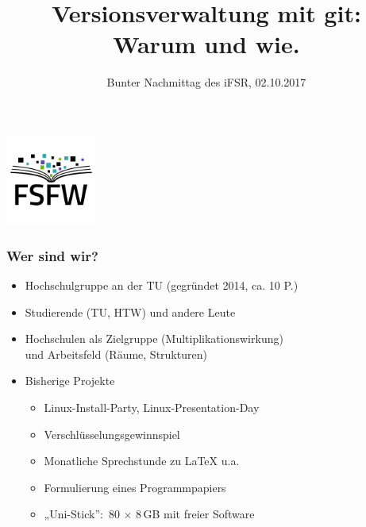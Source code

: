 \documentclass{beamer}
\title{Versionsverwaltung mit git: Warum und wie.}
\subtitle{Bunter Nachmittag des iFSR, 02.10.2017}
\begin{document}
\begin{frame}
  \begin{center}%
    \includegraphics[width=3cm]{img-src/fsfw-logo-with-text.pdf}\\

    \vspace*{-0.5\baselineskip}

    \parbox{.95\columnwidth}{\centering\Large\inserttitle}

    \vspace*{\baselineskip}

    \structure{\large \insertsubtitle}
  \end{center}
\end{frame}

\begin{frame}[label=wb]

\begin{center}
 \vspace{10mm}
\end{center}

\end{frame}



\begin{frame}[label=ct1]
  \frametitle{Wer sind wir?}

  \onslide<+->

  \begin{itemize}
  \item Hochschulgruppe an der TU (gegründet 2014, ca. 10 P.)
  \item Studierende (TU, HTW) und andere Leute
  \item Hochschulen als Zielgruppe (Multiplikationswirkung)\\
    und Arbeitsfeld (Räume, Strukturen)

    \bigskip\onslide<+->

  \item Bisherige Projekte
    \begin{itemize}
    \item Linux-Install-Party, Linux-Presentation-Day
    \item Verschlüsselungsgewinnspiel
    \item Monatliche Sprechstunde zu \LaTeX{} u.a.
    \item Formulierung eines Programmpapiers
    \item „Uni-Stick”:~80 $\times$ 8\,GB mit freier Software
    \end{itemize}
  \end{itemize}
\end{frame}
\end{document}
